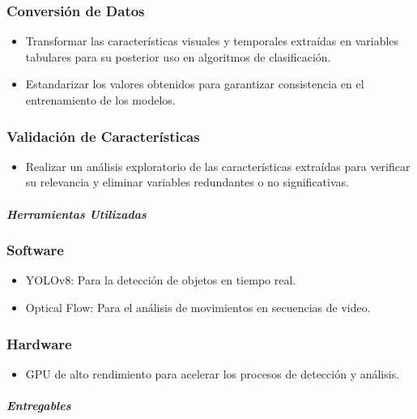 \documentclass[listof=nochaptergap,12pt,times,authoryear]{report}
\begin{document}
\subsubsection{Conversión de Datos}
\begin{itemize}
    \item Transformar las características visuales y temporales extraídas en variables tabulares para su posterior uso en algoritmos de clasificación.
    \item Estandarizar los valores obtenidos para garantizar consistencia en el entrenamiento de los modelos.
\end{itemize}



\subsubsection{Validación de Características}
\begin{itemize}
    \item Realizar un análisis exploratorio de las características extraídas para verificar su relevancia y eliminar variables redundantes o no significativas.
\end{itemize}


\paragraph{\textit{Herramientas Utilizadas}}

\subsubsection{Software}
\begin{itemize}
    \item YOLOv8: Para la detección de objetos en tiempo real.
    \item Optical Flow: Para el análisis de movimientos en secuencias de video.
\end{itemize}

\subsubsection{Hardware}
\begin{itemize}
    \item GPU de alto rendimiento para acelerar los procesos de detección y análisis.
\end{itemize}

\paragraph{\textit{Entregables}}
\end{document}
